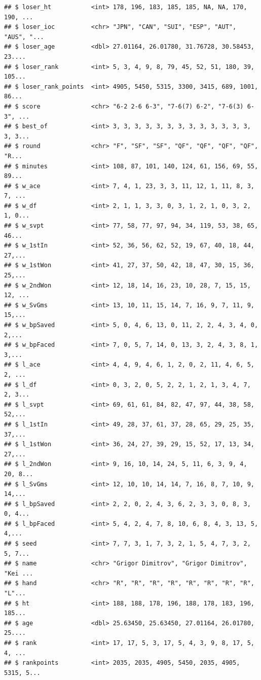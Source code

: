 \documentclass[]{article}
\begin{document}
\begin{verbatim}
## $ loser_ht           <int> 178, 196, 183, 185, 185, NA, NA, 170, 190, ...
## $ loser_ioc          <chr> "JPN", "CAN", "SUI", "ESP", "AUT", "AUS", "...
## $ loser_age          <dbl> 27.01164, 26.01780, 31.76728, 30.58453, 23....
## $ loser_rank         <int> 5, 3, 4, 9, 8, 79, 45, 52, 51, 180, 39, 105...
## $ loser_rank_points  <int> 4905, 5450, 5315, 3300, 3415, 689, 1001, 86...
## $ score              <chr> "6-2 2-6 6-3", "7-6(7) 6-2", "7-6(3) 6-3", ...
## $ best_of            <int> 3, 3, 3, 3, 3, 3, 3, 3, 3, 3, 3, 3, 3, 3, 3...
## $ round              <chr> "F", "SF", "SF", "QF", "QF", "QF", "QF", "R...
## $ minutes            <int> 108, 87, 101, 140, 124, 61, 156, 69, 55, 89...
## $ w_ace              <int> 7, 4, 1, 23, 3, 3, 11, 12, 1, 11, 8, 3, 7, ...
## $ w_df               <int> 2, 1, 1, 3, 3, 0, 3, 1, 2, 1, 0, 3, 2, 1, 0...
## $ w_svpt             <int> 77, 58, 77, 97, 94, 34, 119, 53, 38, 65, 46...
## $ w_1stIn            <int> 52, 36, 56, 62, 52, 19, 67, 40, 18, 44, 27,...
## $ w_1stWon           <int> 41, 27, 37, 50, 42, 18, 47, 30, 15, 36, 25,...
## $ w_2ndWon           <int> 12, 18, 14, 16, 23, 10, 28, 7, 15, 15, 12, ...
## $ w_SvGms            <int> 13, 10, 11, 15, 14, 7, 16, 9, 7, 11, 9, 15,...
## $ w_bpSaved          <int> 5, 0, 4, 6, 13, 0, 11, 2, 2, 4, 3, 4, 0, 2,...
## $ w_bpFaced          <int> 7, 0, 5, 7, 14, 0, 13, 3, 2, 4, 3, 8, 1, 3,...
## $ l_ace              <int> 4, 4, 9, 4, 6, 1, 2, 0, 2, 11, 4, 6, 5, 2, ...
## $ l_df               <int> 0, 3, 2, 0, 5, 2, 2, 1, 2, 1, 3, 4, 7, 2, 3...
## $ l_svpt             <int> 69, 61, 61, 84, 82, 47, 97, 44, 38, 58, 52,...
## $ l_1stIn            <int> 49, 28, 37, 61, 37, 28, 65, 29, 25, 35, 37,...
## $ l_1stWon           <int> 36, 24, 27, 39, 29, 15, 52, 17, 13, 34, 27,...
## $ l_2ndWon           <int> 9, 16, 10, 14, 24, 5, 11, 6, 3, 9, 4, 20, 8...
## $ l_SvGms            <int> 12, 10, 10, 14, 14, 7, 16, 8, 7, 10, 9, 14,...
## $ l_bpSaved          <int> 2, 2, 0, 2, 4, 3, 6, 2, 3, 3, 0, 8, 3, 0, 4...
## $ l_bpFaced          <int> 5, 4, 2, 4, 7, 8, 10, 6, 8, 4, 3, 13, 5, 4,...
## $ seed               <int> 7, 7, 3, 1, 7, 3, 2, 1, 5, 4, 7, 3, 2, 5, 7...
## $ name               <chr> "Grigor Dimitrov", "Grigor Dimitrov", "Kei ...
## $ hand               <chr> "R", "R", "R", "R", "R", "R", "R", "R", "L"...
## $ ht                 <int> 188, 188, 178, 196, 188, 178, 183, 196, 185...
## $ age                <dbl> 25.63450, 25.63450, 27.01164, 26.01780, 25....
## $ rank               <int> 17, 17, 5, 3, 17, 5, 4, 3, 9, 8, 17, 5, 4, ...
## $ rankpoints         <int> 2035, 2035, 4905, 5450, 2035, 4905, 5315, 5...

\end{verbatim}
\end{document}
